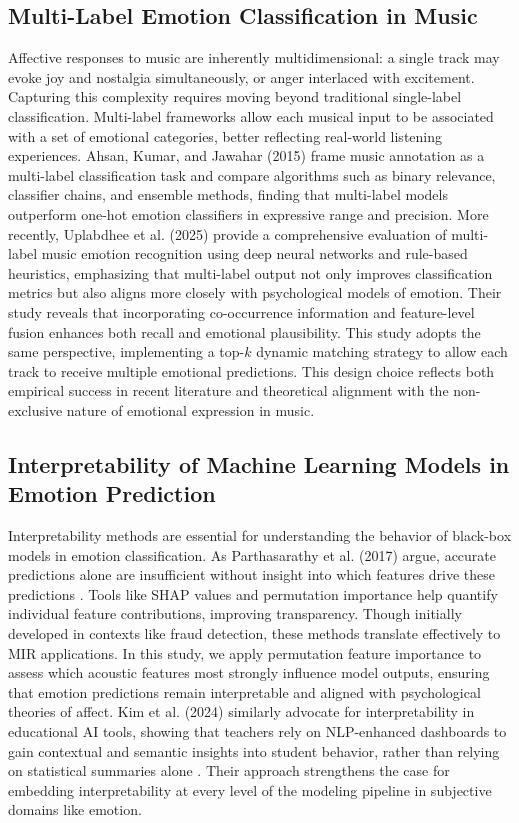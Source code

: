 \documentclass{article}
\begin{document}
\subsection{Multi-Label Emotion Classification in Music}

Affective responses to music are inherently multidimensional: a single track may evoke joy and nostalgia simultaneously, or anger interlaced with excitement. Capturing this complexity requires moving beyond traditional single-label classification. Multi-label frameworks allow each musical input to be associated with a set of emotional categories, better reflecting real-world listening experiences. Ahsan, Kumar, and Jawahar (2015) frame music annotation as a multi-label classification task and compare algorithms such as binary relevance, classifier chains, and ensemble methods, finding that multi-label models outperform one-hot emotion classifiers in expressive range and precision. More recently, Uplabdhee et al. (2025) provide a comprehensive evaluation of multi-label music emotion recognition using deep neural networks and rule-based heuristics, emphasizing that multi-label output not only improves classification metrics but also aligns more closely with psychological models of emotion. Their study reveals that incorporating co-occurrence information and feature-level fusion enhances both recall and emotional plausibility. This study adopts the same perspective, implementing a top-$k$ dynamic matching strategy to allow each track to receive multiple emotional predictions. This design choice reflects both empirical success in recent literature and theoretical alignment with the non-exclusive nature of emotional expression in music.



\subsection{Interpretability of Machine Learning Models in Emotion Prediction}

Interpretability methods are essential for understanding the behavior of black-box models in emotion classification. As Parthasarathy et al. (2017) argue, accurate predictions alone are insufficient without insight into which features drive these predictions \parencite{Parthasarathy2017}. Tools like SHAP values and permutation importance help quantify individual feature contributions, improving transparency. Though initially developed in contexts like fraud detection, these methods translate effectively to MIR applications. In this study, we apply permutation feature importance to assess which acoustic features most strongly influence model outputs, ensuring that emotion predictions remain interpretable and aligned with psychological theories of affect. Kim et al. (2024) similarly advocate for interpretability in educational AI tools, showing that teachers rely on NLP-enhanced dashboards to gain contextual and semantic insights into student behavior, rather than relying on statistical summaries alone \parencite{Kim2024}. Their approach strengthens the case for embedding interpretability at every level of the modeling pipeline in subjective domains like emotion.
\end{document}
